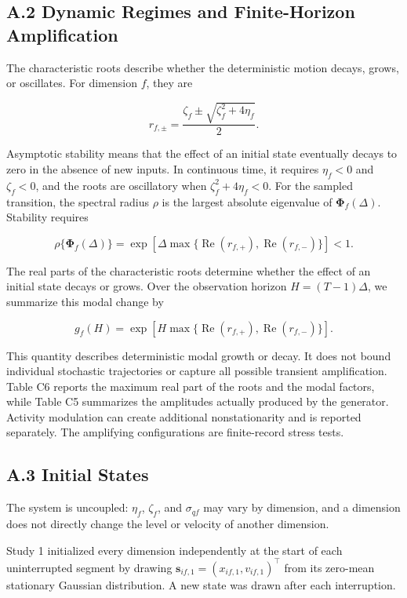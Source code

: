 \documentclass[
]{article}
\begin{document}
\subsection{A.2 Dynamic Regimes and Finite-Horizon
Amplification}\label{a.2-dynamic-regimes-and-finite-horizon-amplification}

The characteristic roots describe whether the deterministic motion
decays, grows, or oscillates. For dimension \(f\), they are

\[
r_{f,\pm}=\frac{\zeta_f\pm\sqrt{\zeta_f^2+4\eta_f}}{2}.
\]

Asymptotic stability means that the effect of an initial state
eventually decays to zero in the absence of new inputs. In continuous
time, it requires \(\eta_f<0\) and \(\zeta_f<0\), and the roots are
oscillatory when \(\zeta_f^2+4\eta_f<0\). For the sampled transition,
the spectral radius \(\rho\) is the largest absolute eigenvalue of
\(\boldsymbol\Phi_f(\Delta)\). Stability requires

\[
\rho\{\boldsymbol{\Phi}_f(\Delta)\}
=\exp\!\left[\Delta\max\{\operatorname{Re}(r_{f,+}),\operatorname{Re}(r_{f,-})\}\right]<1.
\]

The real parts of the characteristic roots determine whether the effect
of an initial state decays or grows. Over the observation horizon
\(H=(T-1)\Delta\), we summarize this modal change by

\[
g_f(H)=\exp\!\left[H\max\{\operatorname{Re}(r_{f,+}),\operatorname{Re}(r_{f,-})\}\right].
\]

This quantity describes deterministic modal growth or decay. It does not
bound individual stochastic trajectories or capture all possible
transient amplification. Table C6 reports the maximum real part of the
roots and the modal factors, while Table C5 summarizes the amplitudes
actually produced by the generator. Activity modulation can create
additional nonstationarity and is reported separately. The amplifying
configurations are finite-record stress tests.

\subsection{A.3 Initial States}\label{a.3-initial-states}

The system is uncoupled: \(\eta_f\), \(\zeta_f\), and \(\sigma_{qf}\)
may vary by dimension, and a dimension does not directly change the
level or velocity of another dimension.

Study 1 initialized every dimension independently at the start of each
uninterrupted segment by drawing
\(\mathbf s_{if,1}=(x_{if,1},v_{if,1})^\top\) from its zero-mean
stationary Gaussian distribution. A new state was drawn after each
interruption.
\end{document}

